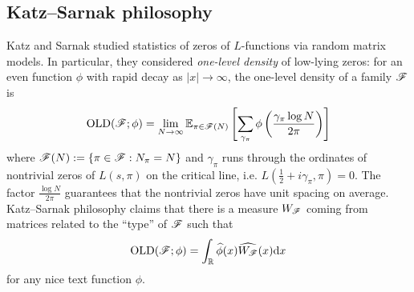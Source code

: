\subsection{Katz--Sarnak philosophy}


Katz and Sarnak \cite{katz1999zeroes,katz2023random} studied statistics of zeros of $L$-functions via random matrix models.
In particular, they considered \emph{one-level density} of low-lying zeros: for an even function $\phi$ with rapid decay as $|x| \to \infty$, the one-level density of a family $\mathscr{F}$ is
\begin{equation}
    \mathrm{OLD}(\mathscr{F}; \phi) = \lim_{N \to \infty} \mathbb{E}_{\pi \in \mathscr{F}(N)} \left[\sum_{\gamma_\pi} \phi\left(\frac{\gamma_\pi \log N}{2 \pi}\right)\right]
\end{equation}
where $\mathscr{F}(N) := \{\pi \in \mathscr{F}: N_\pi = N\}$ and $\gamma_\pi$ runs through the ordinates of nontrivial zeros of $L(s, \pi)$ on the critical line, i.e. $L\left(\frac{1}{2} + i\gamma_\pi, \pi\right) = 0$.
The factor $\frac{\log N}{2\pi}$ guarantees that the nontrivial zeros have unit spacing on average.
Katz--Sarnak philosophy claims that there is a measure $W_{\mathscr{F}}$ coming from matrices related to the ``type'' of $\mathscr{F}$ such that
\begin{equation}
    \mathrm{OLD}(\mathscr{F}; \phi) = \int_{\mathbb{R}} \widehat{\phi}(x) \widehat{W_{\mathscr{F}}}(x) \mathrm{d} x
\end{equation}
for any nice text function $\phi$.

